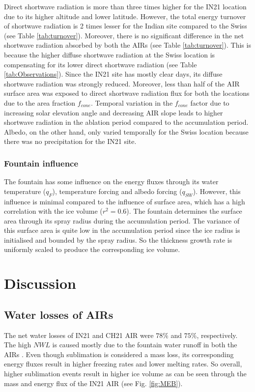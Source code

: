 \documentclass[utf8]{frontiersSCNS}
\begin{document}
Direct shortwave radiation is more than three times higher for the IN21 location due to its higher altitude and
lower latitude. However, the total energy turnover of shortwave radiation is 2 times lesser for the Indian site
compared to the Swiss (see Table \ref{tab:turnover}). Moreover, there is no significant difference in the net
shortwave radiation absorbed by both the AIRs (see Table \ref{tab:turnover}). This is because the higher diffuse
shortwave radiation at the Swiss location is compensating for its lower direct shortwave radiation (see Table
\ref{tab:Observations}). Since the IN21 site has mostly clear days, its diffuse shortwave radiation was strongly
reduced. Moreover, less than half of the AIR surface area was exposed to direct shortwave radiation flux for
both the locations due to the area fraction $f_{cone}$. Temporal variation in the $f_{cone}$ factor due to
increasing solar elevation angle and decreasing AIR slope leads to higher shortwave radiation in the ablation
period compared to the accumulation period. Albedo, on the other hand, only varied temporally for the Swiss
location because there was no precipitation for the IN21 site.


\subsubsection{Fountain influence}

The fountain has some influence on the energy fluxes through its water temperature ($q_{F}$), temperature
forcing and albedo forcing ($q_{SW}$). However, this influence is minimal compared to the influence
of surface area, which has a high correlation with the ice volume ($r^2=0.6$). The fountain determines the
surface area through its spray radius during the accumulation period. The variance of this surface area is quite
low in the accumulation period since the ice radius is initialised and bounded by the spray radius. So the
thickness growth rate is uniformly scaled to produce the corresponding ice volume.

\section{Discussion}

\subsection{Water losses of AIRs}

The net water losses of IN21 and CH21 AIR were $78\%$ and $75\%$, respectively. The high $NWL$ is caused mostly
due to the fountain water runoff in both the AIRs . Even though sublimation is considered a mass loss, its
corresponding energy fluxes result in higher freezing rates and lower melting rates. So overall, higher
sublimation events result in higher ice volume as can be seen through the mass and energy flux of the IN21 AIR
(see Fig.  \ref{fig:MEB}).
\end{document}
